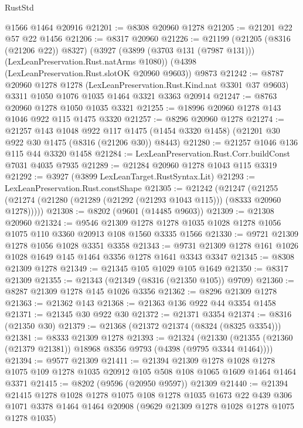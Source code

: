 \begin{lexlean}{RustStd}
\begin{coremodule}
    @1566
    @1464
    @20916
@21201 := @8308 @20960 @1278
@21205 := @21201 @22 @57 @22 @1456
@21206 := @8317 @20960
@21226 := @21199
    (@21205 (@8316 (@21206 @22)) @8327)
    (@3927 (@3899 (@3703 @131 (@7987 @131))) (LexLeanPreservation.Rust.natArms @1080))
    (@4398 (LexLeanPreservation.Rust.slotOK @20960 @9603))
    @9873
@21242 := @8787
    @20960
    @1278
    @1278
    (LexLeanPreservation.Rust.Kind.nat @3301 @37 @9603)
    @3311
    @1050
    @1076
    @1035
    @1464
    @3321
    @3363
    @20914
@21247 := @8763 @20960 @1278 @1050 @1035 @3321
@21255 := @18996 @20960 @1278 @143 @1046 @922 @115 @1475 @3320
@21257 := @8296 @20960 @1278
@21274 := @21257
    @143
    @1048
    @922
    @117
    @1475
    (@1454 @3320 @1458)
    (@21201 @30 @922 @30 @1475 (@8316 (@21206 @30)) @8443)
@21280 := @21257 @1046 @136 @115 @44 @3320 @1458
@21284 := LexLeanPreservation.Rust.Corr.buildConst @7031 @4035 @7935
@21289 := @21284 @20960 @1278 @1043 @115 @3319
@21292 := @3927 (@3899 LexLeanTarget.RustSyntax.Lit)
@21293 := LexLeanPreservation.Rust.constShape
@21305 := @21242
    (@21247 (@21255 (@21274 (@21280 (@21289 (@21292 (@21293 @1043 @115))) (@8333 @20960 @1278)))))
@21308 := @8202 (@9601 (@14485 @9603))
@21309 := @21308 @20960
@21324 := @9546
    @21309
    @1278
    @1278
    @1035
    @1028
    @1278
    @1056
    @1075
    @110
    @3360
    @20913
    @108
    @1560
    @3335
    @1566
@21330 := @9721 @21309 @1278 @1056 @1028 @3351 @3358
@21343 := @9731 @21309 @1278 @161 @1026 @1028 @1649 @145 @1464 @3356 @1278 @1641 @3343 @3347
@21345 := @8308 @21309 @1278
@21349 := @21345 @105 @1029 @105 @1649
@21350 := @8317 @21309
@21355 := @21343 (@21349 (@8316 (@21350 @105)) @9709)
@21360 := @8287 @21309 @1278 @145 @1026 @3356
@21362 := @8296 @21309 @1278
@21363 := @21362 @143
@21368 := @21363 @136 @922 @44 @3354 @1458
@21371 := @21345 @30 @922 @30
@21372 := @21371 @3354
@21374 := @8316 (@21350 @30)
@21379 := @21368 (@21372 @21374 (@8324 (@8325 @3354)))
@21381 := @8333 @21309 @1278
@21393 := @21324
    (@21330 (@21355 (@21360 (@21379 @21381)) @18968 @8356 @9793 (@4398 (@9795 @3344 @1464))))
@21394 := @9577 @21309
@21411 := @21394
    @21309
    @1278
    @1028
    @1278
    @1075
    @109
    @1278
    @1035
    @20912
    @105
    @508
    @108
    @1065
    @1609
    @1464
    @1464
    @3371
@21415 := @8202 (@9596 (@20950 @9597)) @21309
@21440 := @21394
    @21415
    @1278
    @1028
    @1278
    @1075
    @108
    @1278
    @1035
    @1673
    @22
    @439
    @306
    @1071
    @3378
    @1464
    @1464
    @20908
    (@9629 @21309 @1278 @1028 @1278 @1075 @1278 @1035)

\end{coremodule}
\end{lexlean}
